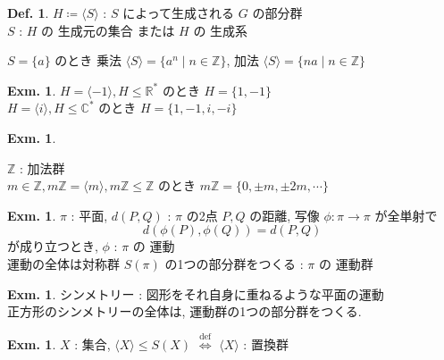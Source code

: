 \documentclass[uplatex,dvipdfmx,9pt]{beamer}
\newcommand{\defarrow}{\overset{\mathrm{def}}{\Leftrightarrow}}
\newcounter{textExmCount}
\theoremstyle{definition} %
\newtheorem{defn}{Def.}[subsection] %
\theoremstyle{example}
\newtheorem{exmText}[textExmCount]{Exm.}
\begin{document}
      \begin{frame}

        \begin{defn}
          $H \coloneqq \langle S \rangle$ : $S$ によって\alert{生成}される $G$ の部分群 \\
          $S$ : $H$ の \alert{生成元の集合} または $H$ の \alert{生成系}
        \end{defn}
        $S = \{a\}$ のとき 乗法 $\langle S \rangle = \{a^n \mid n \in \mathbb{Z}\}$,
        加法 $\langle S \rangle = \{na \mid n \in \mathbb{Z}\}$

        \begin{exmText}
          $H = \langle -1 \rangle, H \le \mathbb{R^*}$ のとき $H = \{1,-1\}$ \\
          $H = \langle i \rangle, H \le \mathbb{C^*}$ のとき $H = \{1,-1,i,-i\}$
        \end{exmText}

        \begin{exmText}
          \hypertarget{exmText3-5}{}
          $\mathbb{Z}$ : 加法群 \\
          $m \in \mathbb{Z}, m\mathbb{Z} = \langle m \rangle, m\mathbb{Z} \le \mathbb{Z}$ のとき $m\mathbb{Z}= \{ 0, \pm m, \pm 2m, \cdots \}$ \\
        \end{exmText}

      \end{frame}

      \begin{frame}

        \begin{exmText}
          $\pi$ : 平面, $d(P,Q)$ : $\pi$ の2点 $P,Q$ の距離, 写像 $\phi \colon \pi \rightarrow \pi$ が全単射で
          \[ d(\phi (P), \phi (Q)) = d(P,Q) \]
          が成り立つとき, $\phi$ : $\pi$ の \alert{運動} \\
          運動の全体は対称群 $S(\pi)$ の1つの部分群をつくる : $\pi$ の \alert{運動群}
        \end{exmText} 

        \begin{exmText}
          \alert{シンメトリー} : 図形をそれ自身に重ねるような平面の運動 \\
          正方形のシンメトリーの全体は, 運動群の1つの部分群をつくる.
        \end{exmText}

        \begin{exmText}
          $X$ : 集合, $\langle X \rangle \le S(X)$ $\defarrow$ $\langle X \rangle$ : \alert{置換群}
        \end{exmText}

      \end{frame}
\end{document}
